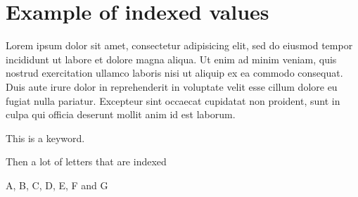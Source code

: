 \chapter{Example of indexed values}

Lorem ipsum dolor sit amet, consectetur adipisicing elit, sed do eiusmod tempor
incididunt ut labore et dolore magna aliqua. Ut enim ad minim veniam, quis
nostrud exercitation ullamco laboris nisi ut aliquip ex ea commodo consequat.
Duis aute irure dolor in reprehenderit in voluptate velit esse cillum dolore eu
fugiat nulla pariatur. Excepteur sint occaecat cupidatat non proident, sunt in
culpa qui officia deserunt mollit anim id est laborum.

This is a keyword.


Then a lot of letters that are indexed

A, B, C, D, E, F and G


